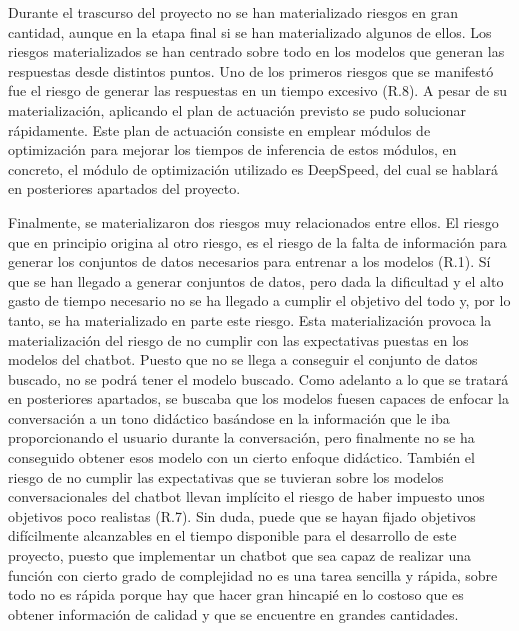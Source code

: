 Durante el trascurso del proyecto no se han materializado riesgos en gran cantidad, aunque en la etapa final si se han materializado algunos de ellos. Los riesgos materializados se han centrado sobre todo en los modelos que generan las respuestas desde distintos puntos. Uno de los primeros riesgos que se manifestó fue el riesgo de generar las respuestas en un tiempo excesivo (R.8). A pesar de su materialización, aplicando el plan de actuación previsto se pudo solucionar rápidamente. Este plan de actuación consiste en emplear módulos de optimización para mejorar los tiempos de inferencia de estos módulos, en concreto, el módulo de optimización utilizado es DeepSpeed, del cual se hablará en posteriores apartados del proyecto.

Finalmente, se materializaron dos riesgos muy relacionados entre ellos. El riesgo que en principio origina al otro riesgo, es el riesgo de la falta de información para generar los conjuntos de datos necesarios para entrenar a los modelos (R.1). Sí que se han llegado a generar conjuntos de datos, pero dada la dificultad y el alto gasto de tiempo necesario no se ha llegado a cumplir el objetivo del todo y, por lo tanto, se ha materializado en parte este riesgo. Esta materialización provoca la materialización del riesgo de no cumplir con las expectativas puestas en los modelos del chatbot. Puesto que no se llega a conseguir el conjunto de datos buscado, no se podrá tener el modelo buscado. Como adelanto a lo que se tratará en posteriores apartados, se buscaba que los modelos fuesen capaces de enfocar la conversación a un tono didáctico basándose en la información que le iba proporcionando el usuario durante la conversación, pero finalmente no se ha conseguido obtener esos modelo con un cierto enfoque didáctico. También el riesgo de no cumplir las expectativas que se tuvieran sobre los modelos conversacionales del chatbot llevan implícito el riesgo de haber impuesto unos objetivos poco realistas (R.7). Sin duda, puede que se hayan fijado objetivos difícilmente alcanzables en el tiempo disponible para el desarrollo de este proyecto, puesto que implementar un chatbot que sea capaz de realizar una función con cierto grado de complejidad no es una tarea sencilla y rápida, sobre todo no es rápida porque hay que hacer gran hincapié en lo costoso que es obtener información de calidad y que se encuentre en grandes cantidades.


